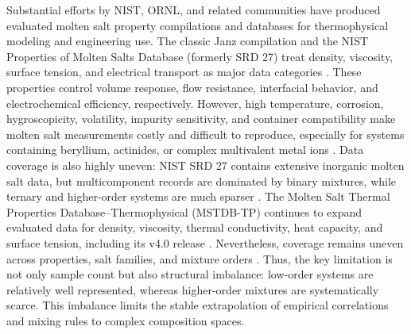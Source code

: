 \documentclass[journal=jctcce,manuscript=article,doi=true]{achemso}
\begin{document}
Substantial efforts by NIST, ORNL, and related communities have produced evaluated molten salt property compilations and databases for thermophysical modeling and engineering use. The classic Janz compilation and the NIST Properties of Molten Salts Database (formerly SRD 27) treat density, viscosity, surface tension, and electrical transport as major data categories \cite{janz1988molten,janz1992nist}. These properties control volume response, flow resistance, interfacial behavior, and electrochemical efficiency, respectively. However, high temperature, corrosion, hygroscopicity, volatility, impurity sensitivity, and container compatibility make molten salt measurements costly and difficult to reproduce, especially for systems containing beryllium, actinides, or complex multivalent metal ions \cite{roper2022molten,chesser2025mstdb,magnusson2020review}. Data coverage is also highly uneven: NIST SRD 27 contains extensive inorganic molten salt data, but multicomponent records are dominated by binary mixtures, while ternary and higher-order systems are much sparser \cite{janz1992nist}. The Molten Salt Thermal Properties Database--Thermophysical (MSTDB-TP) continues to expand evaluated data for density, viscosity, thermal conductivity, heat capacity, and surface tension, including its v4.0 release \cite{chesser2025mstdb}. Nevertheless, coverage remains uneven across properties, salt families, and mixture orders \cite{serranolopez2013molten}. Thus, the key limitation is not only sample count but also structural imbalance: low-order systems are relatively well represented, whereas higher-order mixtures are systematically scarce. This imbalance limits the stable extrapolation of empirical correlations and mixing rules to complex composition spaces.
\end{document}
